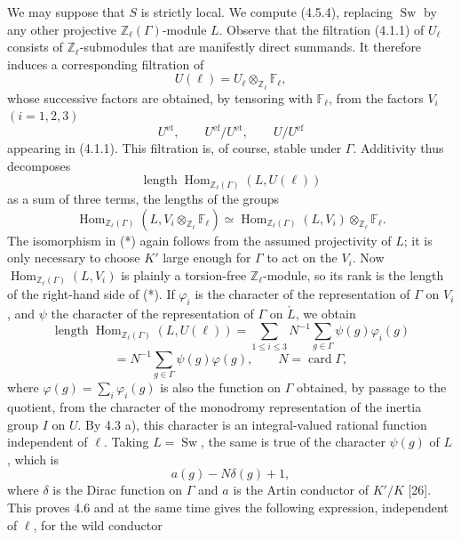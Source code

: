 We may suppose that $S$ is strictly local.  We compute (4.5.4), replacing
$\operatorname{Sw}$ by any other projective
$\mathbb Z_\ell(\Gamma)$-module $L$.  Observe that the filtration
(4.1.1) of $U_\ell$ consists of $\mathbb Z_\ell$-submodules that are
manifestly direct summands.  It therefore induces a corresponding
filtration of
\[
 U(\ell)=U_\ell\otimes_{\mathbb Z_\ell}\mathbb F_\ell,
\]
whose successive factors are obtained, by tensoring with
$\mathbb F_\ell$, from the factors $V_i$ $(i=1,2,3)$
\[
 U^{\mathrm{et}},\qquad
 U^{\mathrm{ef}}/U^{\mathrm{et}},\qquad
 U/U^{\mathrm{ef}}
\]
appearing in (4.1.1).  This filtration is, of course, stable under
$\Gamma$.  Additivity thus decomposes
\[
 \operatorname{length}
 \operatorname{Hom}_{\mathbb Z_\ell(\Gamma)}(L,U(\ell))
\]
as a sum of three terms, the lengths of the groups
\begin{equation}\tag{*}
 \operatorname{Hom}_{\mathbb Z_\ell(\Gamma)}
   (L,V_i\otimes_{\mathbb Z_\ell}\mathbb F_\ell)
 \simeq
 \operatorname{Hom}_{\mathbb Z_\ell(\Gamma)}(L,V_i)
   \otimes_{\mathbb Z_\ell}\mathbb F_\ell.
\end{equation}
The isomorphism in (*) again follows from the assumed projectivity of
$L$; it is only necessary to choose $K'$ large enough for $\Gamma$ to
act on the $V_i$.  Now
$\operatorname{Hom}_{\mathbb Z_\ell(\Gamma)}(L,V_i)$ is plainly a
torsion-free $\mathbb Z_\ell$-module, so its rank is the length of the
right-hand side of (*).  If $\varphi_i$ is the character of the
representation of $\Gamma$ on $V_i$, and $\psi$ the character of the
representation of $\Gamma$ on $\check L$, we obtain
\begin{equation}\tag{4.6.1}
 \operatorname{length}
 \operatorname{Hom}_{\mathbb Z_\ell(\Gamma)}(L,U(\ell))
 =
 \sum_{1\leq i\leq3}N^{-1}
 \sum_{g\in\Gamma}\psi(g)\varphi_i(g)
\end{equation}
\[
 =N^{-1}\sum_{g\in\Gamma}\psi(g)\varphi(g),
 \qquad N=\operatorname{card}\Gamma,
\]
where $\varphi(g)=\sum_i\varphi_i(g)$ is also the function on $\Gamma$
obtained, by passage to the quotient, from the character of the
monodromy representation of the inertia group $I$ on $U$.  By 4.3 a),
this character is an integral-valued rational function independent of
$\ell$.  Taking $L=\operatorname{Sw}$, the same is true of the character
$\psi(g)$ of $L$, which is
\[
 a(g)-N\delta(g)+1,
\]
where $\delta$ is the Dirac function on $\Gamma$ and $a$ is the Artin
conductor of $K'/K$ [26].  This proves 4.6 and at the same time gives the
following expression, independent of $\ell$, for the wild conductor
